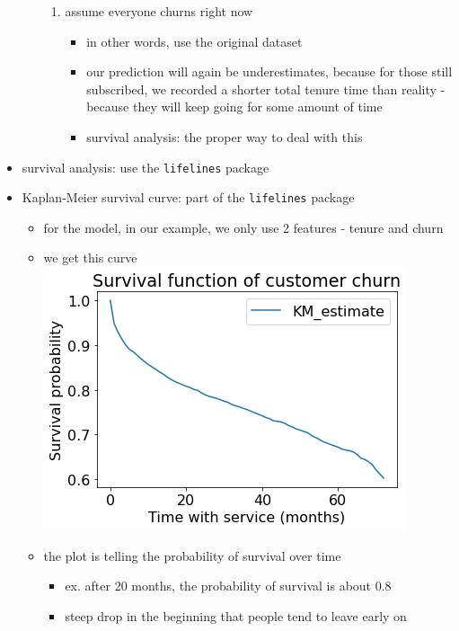 \documentclass[10.5pt,a4paper, fleqn, dvipsnames]{article}
\begin{document}
\begin{itemize}
\begin{itemize}
\begin{enumerate}[leftmargin = 2em]
            \item assume everyone churns right now
            \begin{itemize}[leftmargin = 1.5em]
                \item in other words, use the original dataset
                \item our prediction will again be underestimates, because for those still subscribed, we recorded a shorter total tenure time than reality - because they will keep going for some amount of time
                \item survival analysis: the proper way to deal with this
            \end{itemize}
        \end{enumerate}
    \end{itemize}
    \item survival analysis: use the \lstinline{lifelines} package 
    \newpage 
    \item Kaplan-Meier survival curve: part of the \lstinline{lifelines} package
    \begin{itemize}
        \item for the model, in our example, we only use 2 features - tenure and churn 
        \item we get this curve \\
        \includegraphics[scale = 0.55]{km-curve.png}
        \item the plot is telling the probability of survival over time 
        \begin{itemize}[leftmargin = 2em]
            \item ex. after 20 months, the probability of survival is about 0.8
            \item steep drop in the beginning that people tend to leave early on 

\end{itemize}
\end{itemize}
\end{itemize}
\end{document}
